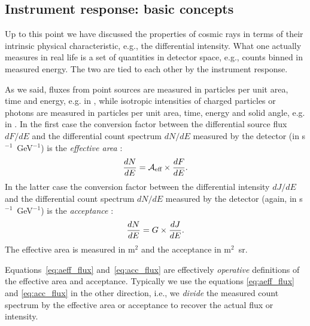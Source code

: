 \subsection{Instrument response: basic concepts}\label{sec:irf}

Up to this point we have discussed the properties of cosmic rays in terms of their
intrinsic physical characteristic, e.g., the differential intensity. What one
actually measures in real life is a set of quantities in detector space, e.g.,
counts binned in measured energy. The two are tied to each other by the instrument
response.

As we said, fluxes from point sources are measured in particles per unit area,
time and energy, e.g. in \fluxunits, while isotropic intensities of charged particles
or photons are measured in particles per unit area, time, energy and solid angle,
e.g. in \intensityunits. In the first case the conversion factor between the
differential source flux $dF/dE$ and the differential count spectrum $dN/dE$ measured
by the detector (in s$^{-1}$~GeV$^{-1}$) is the \emph{effective area} \aeff:
\begin{align}\label{eq:aeff_flux}
  \frac{dN}{dE} = \mathcal{A}_\text{eff} \times \frac{dF}{dE}.
\end{align}
In the latter case the conversion factor between the differential intensity $dJ/dE$
and the differential count spectrum $dN/dE$ measured by the detector (again, in
s$^{-1}$~GeV$^{-1}$) is the \emph{acceptance} \accept:
\begin{align}\label{eq:acc_flux}
  \frac{dN}{dE} = G \times \frac{dJ}{dE}.
\end{align}
The effective area is measured in m$^2$ and the acceptance in m$^2$~sr.

Equations~\eqref{eq:aeff_flux} and~\eqref{eq:acc_flux} are effectively
\emph{operative} definitions of the effective area and acceptance.
Typically we use the equations \eqref{eq:aeff_flux} and \eqref{eq:acc_flux} in the
other direction, i.e., we \emph{divide} the measured count
spectrum by the effective area or acceptance to recover the actual flux or intensity.

